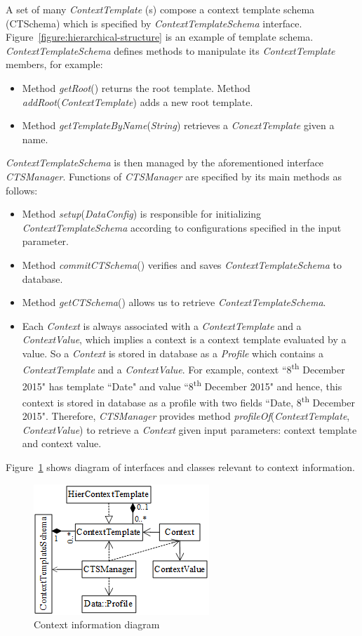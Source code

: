 \documentclass[a4paper,twoside]{article}
\begin{document}
A set of many \textit{ContextTemplate} (s) compose a context template schema (CTSchema) which is specified by \textit{ContextTemplateSchema} interface. Figure~\ref{figure:hierarchical-structure} is an example of template schema. \textit{ContextTemplateSchema} defines methods to manipulate its \textit{ContextTemplate} members, for example:
\begin{itemize}
\item Method \textit{getRoot}() returns the root template. Method \textit{addRoot}(\textit{ContextTemplate}) adds a new root template.
\item Method \textit{getTemplateByName}(\textit{String}) retrieves a \textit{ConextTemplate} given a name.
\end{itemize}
\textit{ContextTemplateSchema} is then managed by the aforementioned interface \textit{CTSManager}. Functions of \textit{CTSManager} are specified by its main methods as follows:
\begin{itemize}
\item Method \textit{setup}(\textit{DataConfig}) is responsible for initializing \textit{ContextTemplateSchema} according to configurations specified in the input parameter.
\item Method \textit{commitCTSchema}() verifies and saves \textit{ContextTemplateSchema} to database.
\item Method \textit{getCTSchema}() allows us to retrieve \textit{ContextTemplateSchema}.
\item Each \textit{Context} is always associated with a \textit{ContextTemplate} and a \textit{ContextValue}, which implies a context is a context template evaluated by a value. So a \textit{Context} is stored in database as a \textit{Profile} which contains a \textit{ContextTemplate} and a \textit{ContextValue}. For example, context ``8\textsuperscript{th} December 2015" has template ``Date" and value ``8\textsuperscript{th} December 2015" and hence, this context is stored in database as a profile with two fields ``Date, 8\textsuperscript{th} December 2015". Therefore, \textit{CTSManager} provides method \textit{profileOf}(\textit{ContextTemplate}, \textit{ContextValue}) to retrieve a \textit{Context} given input parameters: context template and context value.
\end{itemize}
Figure~\ref{figure:context-diagram} shows diagram of interfaces and classes relevant to context information.
\begin{figure}
\centering
\includegraphics{ContextDiagram.png}
\caption{Context information diagram}
\label{figure:context-diagram}
\end{figure}
\end{document}
